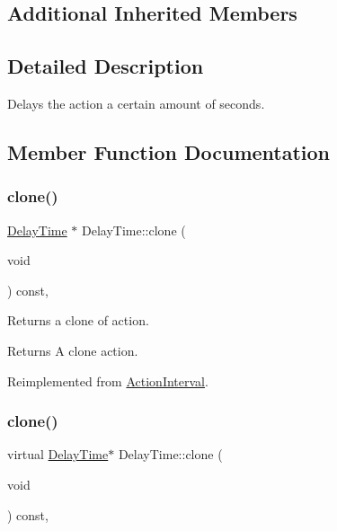 \subsection*{Additional Inherited Members}


\subsection{Detailed Description}
Delays the action a certain amount of seconds. 

\subsection{Member Function Documentation}
\mbox{\label{classDelayTime_a8dd10172bc899410a2dc0e9e48a73706}} 
\subsubsection{\texorpdfstring{clone()}{clone()}\hspace{0.1cm}{\footnotesize\ttfamily [1/2]}}
{\footnotesize\ttfamily \hyperlink{classDelayTime}{Delay\+Time} $\ast$ Delay\+Time\+::clone (\begin{DoxyParamCaption}\item[{void}]{ }\end{DoxyParamCaption}) const\hspace{0.3cm}{\ttfamily [override]}, {\ttfamily [virtual]}}

Returns a clone of action.

\begin{DoxyReturn}{Returns}
A clone action. 
\end{DoxyReturn}


Reimplemented from \hyperlink{classActionInterval_abc93ce0c2f54a90eb216a7803f25f44a}{Action\+Interval}.

\mbox{\label{classDelayTime_a2a5bf1d7c9e02fdb4af4ff1adf8c3734}} 
\subsubsection{\texorpdfstring{clone()}{clone()}\hspace{0.1cm}{\footnotesize\ttfamily [2/2]}}
{\footnotesize\ttfamily virtual \hyperlink{classDelayTime}{Delay\+Time}$\ast$ Delay\+Time\+::clone (\begin{DoxyParamCaption}\item[{void}]{ }\end{DoxyParamCaption}) const\hspace{0.3cm}{\ttfamily [override]}, {\ttfamily [virtual]}}

